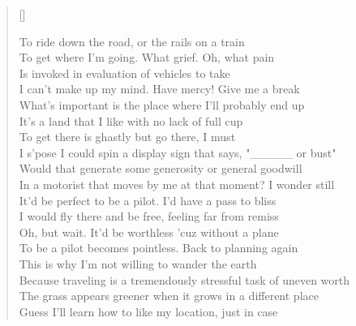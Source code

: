 \documentclass[a5paper,10pt,twoside]{memoir}
\begin{document}
\settowidth{\versewidth}{Because traveling is a tremendously stressful task of uneven worth}
\PlainPoemTitle %
{}
\begin{verse}[\versewidth]

To ride down the road, or the rails on a train\\
To get where I'm going. What grief. Oh, what pain\\
Is invoked in evaluation of vehicles to take\\
I can't make up my mind. Have mercy! Give me a break\\
What's important is the place where I'll probably end up\\
It's a land that I like with no lack of full cup\\
To get there is ghastly but go there, I must\\
I s'pose I could spin a display sign that says, "\_\_\_\_\_ or bust"\\
Would that generate some generosity or general goodwill\\
In a motorist that moves by me at that moment? I wonder still\\
It'd be perfect to be a pilot. I'd have a pass to bliss\\
I would fly there and be free, feeling far from remiss\\
Oh, but wait. It'd be worthless 'cuz without a plane\\
To be a pilot becomes pointless. Back to planning again\\
This is why I'm not willing to wander the earth\\
Because traveling is a tremendously stressful task of uneven worth\\
The grass appears greener when it grows in a different place\\
Guess I'll learn how to like my location, just in case\\
\end{verse}
\end{document}
